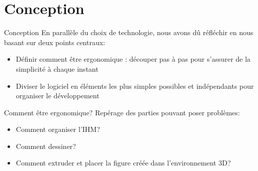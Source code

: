 \documentclass[a4paper,10pt]{beamer}
\begin{document}
	
	\section{Conception}	
		\begin{frame}{Conception}
	 		En parallèle du choix de technologie, nous avons dû réfléchir en nous basant sur deux points centraux:
		
			\begin{itemize}
				  \item Définir comment être ergonomique : découper pas à pas pour s'assurer de la simplicité à chaque instant
				  \item Diviser le logiciel en éléments les plus simples possibles et indépendants pour organiser le développement
			\end{itemize}
		\end{frame}
		
		
		\begin{frame}{Comment être ergonomique?}
				Repérage des parties pouvant poser problèmes:
				
				\begin{itemize}
					\item Comment organiser l'IHM?
					\item Comment dessiner?
					\item Comment extruder et placer la figure créée dans l'environnement 3D?
				\end{itemize}
		\end{frame}	
		
\end{document}
